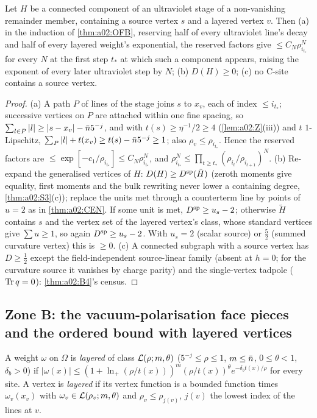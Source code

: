 \begin{lemma}\label{lem:a02:SRC}
Let $H$ be a connected component of an ultraviolet stage of a non-vanishing remainder member, containing a source vertex $s$ and a layered vertex $v$. Then (a) in the induction of \cref{thm:a02:OFB}, reserving half of every ultraviolet line's decay and half of every layered weight's exponential, the reserved factors give $\le C_N\rho_{i_{t_*}}^N$ for every $N$ at the first step $t_*$ at which such a component appears, raising the exponent of every later ultraviolet step by $N$; (b) $D(H)\ge0$; (c) no C-site contains a source vertex.
\end{lemma}
\begin{proof}
(a) A path $P$ of lines of the stage joins $s$ to $x_v$, each of index $\le i_{t_*}$; successive vertices on $P$ are attached within one fine spacing, so $\sum_{l\in P}|l|\ge|s-x_v|-\bar n5^{-j}$, and with $t(s)\ge\eta^{-1}/2\ge4$ (\cref{lem:a02:Z}(iii)) and $t$ $1$-Lipschitz, $\sum_P|l|+t(x_v)\ge t(s)-\bar n5^{-j}\ge1$; also $\rho_v\le\rho_{i_{t_*}}$. Hence the reserved factors are $\le\exp[-c_1/\rho_{i_{t_*}}]\le C_N\rho_{i_{t_*}}^N$, and $\rho_{i_{t_*}}^N\le\prod_{t\ge t_*}(\rho_{i_t}/\rho_{i_{t+1}})^N$. (b) Re-expand the generalised vertices of $H$: $D(H)\ge D^{\mathrm{sp}}(\tilde H)$ (zeroth moments give equality, first moments and the bulk rewriting never lower a containing degree, \cref{thm:a02:S3}(c)); replace the units met through a counterterm line by points of $u=2$ as in \cref{thm:a02:CEN}. If some unit is met, $D^{\mathrm{sp}}\ge u_s-2$; otherwise $\tilde H$ contains $s$ and the vertex set of the layered vertex's class, whose standard vertices give $\sum u\ge1$, so again $D^{\mathrm{sp}}\ge u_s-2$. With $u_s=2$ (scalar source) or $\frac52$ (summed curvature vertex) this is $\ge0$. (c) A connected subgraph with a source vertex has $D\ge\frac12$ except the field-independent source-linear family (absent at $h=0$; for the curvature source it vanishes by charge parity) and the single-vertex tadpole ($\operatorname{Tr} q=0$): \cref{thm:a02:B4}'s census.
\end{proof}

\subsection{Zone B: the vacuum-polarisation face pieces and the ordered bound with layered vertices}\label{ssec:a02:BVP}

\begin{definition}\label{def:a02:lay}
A weight $\omega$ on $\Omega$ is \emph{layered} of class $\mathcal L(\rho;m,\theta)$ ($5^{-j}\le\rho\le1$, $m\le\bar n$, $0\le\theta<1$, $\delta_b>0$) if $|\omega(x)|\le(1+\ln_+(\rho/t(x)))^m(\rho/t(x))^\theta e^{-\delta_bt(x)/\rho}$ for every site. A vertex is \emph{layered} if its vertex function is a bounded function times $\omega_v(x_v)$ with $\omega_v\in\mathcal L(\rho_v;m,\theta)$ and $\rho_v\le\rho_{j(v)}$, $j(v)$ the lowest index of the lines at $v$.
\end{definition}

